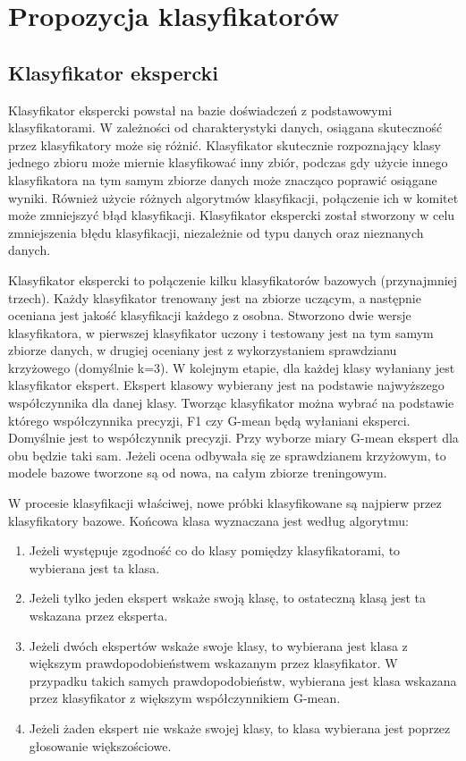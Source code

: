 \chapter{Propozycja klasyfikatorów}
\section{Klasyfikator ekspercki}
Klasyfikator ekspercki powstał na bazie doświadczeń z podstawowymi klasyfikatorami. W zależności od charakterystyki danych, osiągana skuteczność przez klasyfikatory może się różnić. Klasyfikator skutecznie rozpoznający klasy jednego zbioru może miernie klasyfikować inny zbiór, podczas gdy użycie innego klasyfikatora na tym samym zbiorze danych może znacząco poprawić osiągane wyniki. Również użycie różnych algorytmów klasyfikacji, połączenie ich w komitet może zmniejszyć błąd klasyfikacji. 
Klasyfikator ekspercki został stworzony w celu zmniejszenia błędu klasyfikacji, niezależnie od typu danych oraz nieznanych danych. \par
Klasyfikator ekspercki to połączenie kilku klasyfikatorów bazowych (przynajmniej trzech). Każdy klasyfikator trenowany jest na zbiorze uczącym, a następnie oceniana jest jakość klasyfikacji każdego z osobna. Stworzono dwie wersje klasyfikatora, w pierwszej klasyfikator uczony i testowany jest na tym samym zbiorze danych, w drugiej oceniany jest z wykorzystaniem sprawdzianu krzyżowego (domyślnie k=3). W kolejnym etapie, dla każdej klasy wyłaniany jest klasyfikator ekspert. Ekspert klasowy wybierany jest na podstawie najwyższego współczynnika dla danej klasy. Tworząc klasyfikator można wybrać na podstawie którego współczynnika precyzji, F1 czy G-mean będą wyłaniani eksperci. Domyślnie jest to współczynnik precyzji. Przy wyborze miary G-mean ekspert dla obu będzie taki sam. Jeżeli ocena odbywała się ze sprawdzianem krzyżowym, to modele bazowe tworzone są od nowa, na całym zbiorze treningowym. \par
W procesie klasyfikacji właściwej, nowe próbki klasyfikowane są najpierw przez klasyfikatory bazowe. Końcowa klasa wyznaczana jest według algorytmu:
\begin{enumerate}
	\item Jeżeli występuje zgodność co do klasy pomiędzy klasyfikatorami, to wybierana jest ta klasa.
	\item Jeżeli tylko jeden ekspert wskaże swoją klasę, to ostateczną klasą jest ta wskazana przez eksperta.
	\item Jeżeli dwóch ekspertów wskaże swoje klasy, to wybierana jest klasa z większym prawdopodobieństwem wskazanym przez klasyfikator. W przypadku takich samych prawdopodobieństw, wybierana jest klasa wskazana przez klasyfikator z większym współczynnikiem G-mean.
	\item Jeżeli żaden ekspert nie wskaże swojej klasy, to klasa wybierana jest poprzez głosowanie większościowe.
\end{enumerate}
